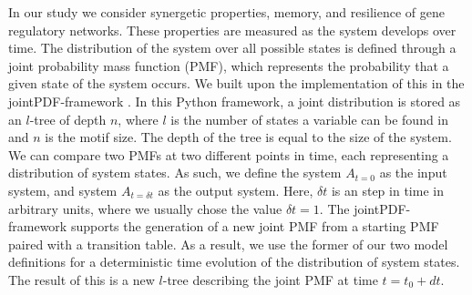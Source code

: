 \documentclass[../main.tex]{subfiles}
\begin{document}
In our study we consider synergetic properties, memory, and resilience of gene regulatory networks.
These properties are measured as the system develops over time.
The distribution of the system over all possible states is defined through a joint probability mass function (PMF), which represents the probability that a given state of the system occurs. %
We built upon the implementation of this in the jointPDF-framework \cite{jointpdf}.
In this Python framework, a joint distribution is stored as an $l$-tree of depth $n$, where $l$ is the number of states a variable can be found in and $n$ is the motif size.
The depth of the tree is equal to the size of the system.
We can compare two PMFs at two different points in time, each representing a distribution of system states.
As such, we define the system $A_{t=0}$ as the input system, and system $A_{t=\delta t}$ as the output system.
Here, $\delta t$ is an step in time in arbitrary units, where we usually chose the value $\delta t = 1$. 
The jointPDF-framework supports the generation of a new joint PMF from a starting PMF paired with a transition table.
As a result, we use the former of our two model definitions for a deterministic time evolution of the distribution of system states. %
The result of this is a new $l$-tree describing the joint PMF at time $t=t_0+dt$.
\end{document}
